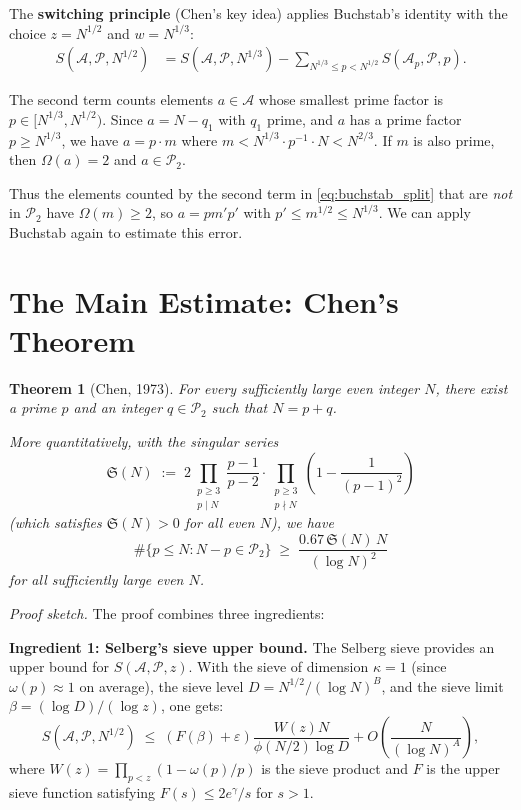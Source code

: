 \documentclass[12pt,a4paper]{amsart}
\newtheorem{theorem}{Theorem}[section]
\theoremstyle{definition}
\newcommand{\Ptwo}{\mathcal{P}_2}
\newcommand{\OOmega}{\Omega}   %
\begin{document}
The \textbf{switching principle} (Chen's key idea) applies Buchstab's
identity with the choice $z = N^{1/2}$ and $w = N^{1/3}$:
\begin{align}
  S(\mathcal{A}, \mathcal{P}, N^{1/2})
  &= S(\mathcal{A}, \mathcal{P}, N^{1/3})
  - \sum_{N^{1/3} \leq p < N^{1/2}} S(\mathcal{A}_p, \mathcal{P}, p).
  \label{eq:buchstab_split}
\end{align}

The second term counts elements $a \in \mathcal{A}$ whose smallest prime
factor is $p \in [N^{1/3}, N^{1/2})$.  Since $a = N - q_1$ with $q_1$
prime, and $a$ has a prime factor $p \geq N^{1/3}$, we have $a = p \cdot m$
where $m < N^{1/3} \cdot p^{-1} \cdot N < N^{2/3}$.  If $m$ is also prime,
then $\OOmega(a) = 2$ and $a \in \Ptwo$.

Thus the elements counted by the second term in \eqref{eq:buchstab_split}
that are \emph{not} in $\Ptwo$ have $\OOmega(m) \geq 2$, so $a = pm'p'$
with $p' \leq m^{1/2} \leq N^{1/3}$.  We can apply Buchstab again to
estimate this error.

\section{The Main Estimate: Chen's Theorem}

\begin{theorem}[Chen, 1973]\label{thm:chen}
  For every sufficiently large even integer $N$, there exist a prime $p$
  and an integer $q \in \Ptwo$ such that $N = p + q$.

  More quantitatively, with the singular series
  \[
    \mathfrak{S}(N)
    \;:=\;
    2\prod_{\substack{p \geq 3 \\ p \mid N}}
    \frac{p-1}{p-2}
    \cdot
    \prod_{\substack{p \geq 3 \\ p \nmid N}}
    \left(1 - \frac{1}{(p-1)^2}\right)
  \]
  (which satisfies $\mathfrak{S}(N) > 0$ for all even $N$), we have
  \[
    \#\bigl\{p \leq N : N-p \in \Ptwo\bigr\}
    \;\geq\;
    \frac{0.67\,\mathfrak{S}(N)\, N}{(\log N)^2}
  \]
  for all sufficiently large even $N$.
\end{theorem}

\textit{Proof sketch.}  The proof combines three ingredients:

\textbf{Ingredient 1: Selberg's sieve upper bound.}
The Selberg sieve provides an upper bound for $S(\mathcal{A},\mathcal{P},z)$.
With the sieve of dimension $\kappa = 1$ (since $\omega(p) \approx 1$ on
average), the sieve level $D = N^{1/2}/(\log N)^B$, and the sieve
limit $\beta = (\log D)/(\log z)$, one gets:
\[
  S(\mathcal{A}, \mathcal{P}, N^{1/2})
  \;\leq\;
  (F(\beta) + \varepsilon)\frac{W(z) N}{\phi(N/2)\log D}
  + O\!\left(\frac{N}{(\log N)^A}\right),
\]
where $W(z) = \prod_{p < z}(1 - \omega(p)/p)$ is the sieve product and
$F$ is the upper sieve function satisfying $F(s) \leq 2e^\gamma/s$ for
$s > 1$.
\end{document}
